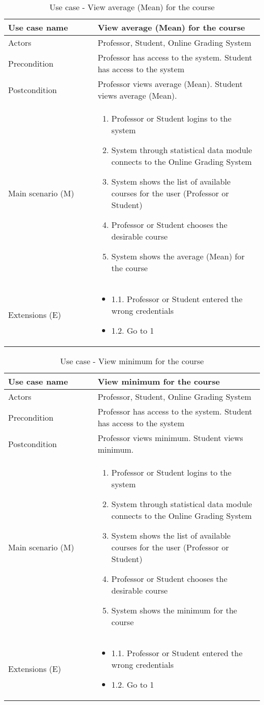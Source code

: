 \documentclass[12pt]{article}
\newcommand\tabularhead[1]{
\begin{table}[h]
  \caption{Use case - #1}
  \begin{tabular}{|p{0.35\linewidth}|p{0.65\linewidth}|}
    \hline
    \textbf{Use case name} & \textbf{#1} \\
    \hline}
\newcommand\addrow[2]{#1 &#2\\ \hline}
\newcommand\adddoublerow[2]{\begin{minipage}[t][][t]{2.5cm}#1\end{minipage}%
    &\begin{minipage}[t][][t]{\linewidth}
     \begin{itemize}\setlength{\itemsep}{0pt}%
        #2     
     \end{itemize}
     \end{minipage}\\ \hline}
\newcommand\addmulrow[2]{ \begin{minipage}[t][][t]{2.5cm}#1\end{minipage}%
     &\begin{minipage}[t][][t]{\linewidth}
      \begin{enumerate}\setlength{\itemsep}{0pt}%
        #2   
      \end{enumerate}
      \end{minipage}\\ \hline}
\newenvironment{usecase}{\tabularhead}
{\hline\end{tabular}\end{table}}
\begin{document}
\begin{usecase}{View average (Mean) for the course}
    \addrow{Actors}{Professor, Student, Online Grading System}
    \addrow{Precondition}{Professor has access to the system. Student has access to the system}
    \addrow{Postcondition}{Professor views average (Mean). Student views average (Mean).}
    \addmulrow{Main scenario (M)}{
        \item Professor or Student logins to the system
        \item System through statistical data module connects to the Online Grading System
        \item System shows the list of available courses for the user (Professor or Student)
        \item Professor or Student chooses the desirable course
        \item System shows the average (Mean) for the course
    }
    \adddoublerow{Extensions (E)}{
        \item[] 1.1. Professor or Student entered the wrong credentials
        \item[] 1.2. Go to 1
    }
\end{usecase}
\newpage
\begin{usecase}{View minimum for the course}
    \addrow{Actors}{Professor, Student, Online Grading System}
    \addrow{Precondition}{Professor has access to the system. Student has access to the system}
    \addrow{Postcondition}{Professor views minimum.  Student views minimum.}
    \addmulrow{Main scenario (M)}{
        \item Professor or Student logins to the system
        \item System through statistical data module connects to the Online Grading System
        \item System shows the list of available courses for the user (Professor or Student)
        \item Professor or Student chooses the desirable course
        \item System shows the minimum for the course
    }
    \adddoublerow{Extensions (E)}{
        \item[] 1.1. Professor or Student entered the wrong credentials
        \item[] 1.2. Go to 1
    }
\end{usecase}
\end{document}
